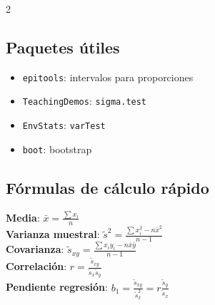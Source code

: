 \documentclass[9pt,a4paper]{article}
\begin{document}
\begin{multicols}{2}
\subsection{Paquetes útiles}
\begin{itemize}[leftmargin=*]
\item \texttt{epitools}: intervalos para proporciones
\item \texttt{TeachingDemos}: \texttt{sigma.test}
\item \texttt{EnvStats}: \texttt{varTest}
\item \texttt{boot}: bootstrap
\end{itemize}

\subsection{Fórmulas de cálculo rápido}
\begin{formulabox}
\textbf{Media}: $\bar{x}=\frac{\sum x_i}{n}$\\[3pt]
\textbf{Varianza muestral}: $\tilde{s}^2=\frac{\sum x_i^2-n\bar{x}^2}{n-1}$\\[3pt]
\textbf{Covarianza}: $\tilde{s}_{xy}=\frac{\sum x_iy_i-n\bar{x}\bar{y}}{n-1}$\\[3pt]
\textbf{Correlación}: $r=\frac{\tilde{s}_{xy}}{\tilde{s}_x\tilde{s}_y}$\\[3pt]
\textbf{Pendiente regresión}: $b_1=\frac{\tilde{s}_{xy}}{\tilde{s}_x^2}=r\frac{\tilde{s}_y}{\tilde{s}_x}$
\end{formulabox}

\end{multicols}
\end{document}
